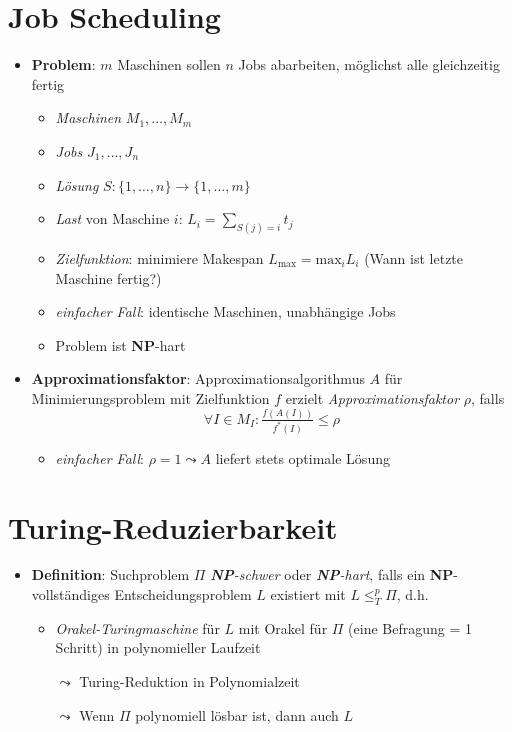\section{Job Scheduling}

\begin{itemize}
  \item \textbf{Problem}: $ m $ Maschinen sollen $ n $ Jobs abarbeiten, möglichst alle gleichzeitig fertig
  \begin{itemize}
    \item \emph{Maschinen} $ M_1, \dots, M_m $
    \item \emph{Jobs} $ J_1, \dots, J_n $
    \item \emph{Lösung} $ S: \{ 1,\dots,n \} \to \{ 1,\dots,m \} $
    \item \emph{Last} von Maschine $ i $: $ L_i = \sum_{S(j) = i}t_j $
    \item \emph{Zielfunktion}: minimiere Makespan $ L_\text{max} = \text{max}_iL_i $ (Wann ist letzte Maschine fertig?)
    \item \emph{einfacher Fall}: identische Maschinen, unabhängige Jobs
    \item Problem ist \textbf{NP}-hart
  \end{itemize}
  \item \textbf{Approximationsfaktor}: Approximationsalgorithmus $ A $ für Minimierungsproblem mit Zielfunktion $ f $ erzielt \emph{Approximationsfaktor} $ \rho $, falls
  \begin{equation*}
    \forall I \in M_I : \tfrac{f(A(I))}{f^\ast(I)} \leq \rho
  \end{equation*}
  \begin{itemize}
    \item \emph{einfacher Fall}: $ \rho = 1 \leadsto A $ liefert stets optimale Lösung
  \end{itemize}
\end{itemize}

\section{Turing-Reduzierbarkeit}

\begin{itemize}
  \item \textbf{Definition}: Suchproblem $ \Pi $ \emph{\textbf{NP}-schwer} oder \emph{\textbf{NP}-hart}, falls ein \textbf{NP}-vollständiges Entscheidungsproblem $ L $ existiert mit $ L \leq_T^p \Pi $, d.h.
  \begin{itemize}
    \item \emph{Orakel-Turingmaschine} für $ L $ mit Orakel für $ \Pi $ (eine Befragung = 1 Schritt) in polynomieller Laufzeit
    \item[$ \leadsto $] Turing-Reduktion in Polynomialzeit
    \item[$ \leadsto $] Wenn $ \Pi $ polynomiell lösbar ist, dann auch $ L $
  \end{itemize}
\end{itemize}

